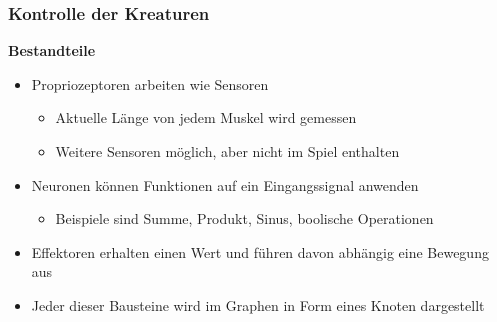 \documentclass{beamer}
\begin{document}
\begin{frame}
	\frametitle{Kontrolle der Kreaturen}
	\textbf{Bestandteile}\\ \pause
	\begin{itemize}
		\item Propriozeptoren arbeiten wie Sensoren \pause
		\begin{itemize}
			\item Aktuelle Länge von jedem Muskel wird gemessen \pause
			\item Weitere Sensoren möglich, aber nicht im Spiel enthalten \pause
		\end{itemize}
		\item Neuronen können Funktionen auf ein Eingangssignal anwenden \pause
		\begin{itemize}
			\item Beispiele sind Summe, Produkt, Sinus, boolische Operationen \pause
		\end{itemize}
		\item Effektoren erhalten einen Wert und führen davon abhängig eine Bewegung aus
		\item Jeder dieser Bausteine wird im Graphen in Form eines Knoten dargestellt
	\end{itemize}
\end{frame}
\end{document}
